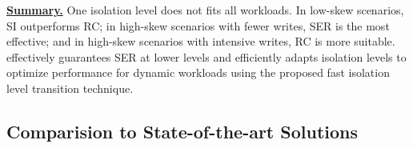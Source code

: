 \noindent \textbf{\underline{Summary.}} One isolation level does not fits all workloads. 
In low-skew scenarios, SI outperforms RC; in high-skew scenarios with fewer writes, SER is the most effective; and in high-skew scenarios with intensive writes, RC is more suitable. 
\sysname effectively guarantees SER at lower levels and efficiently adapts isolation levels to optimize performance for dynamic workloads using the proposed fast isolation level transition technique.


\subsection{Comparision to State-of-the-art Solutions}
\label{sec:evaluation:compare-to-other-soluation}



